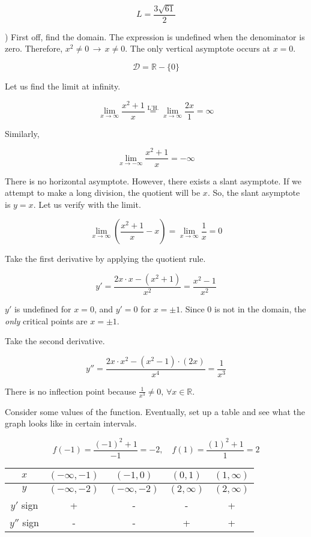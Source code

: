\documentclass{article}
\begin{document}
\[\boxed{L=\frac{3\sqrt{61}}{2}}\]

\hfill

) First off, find the domain. The expression is undefined when the denominator is zero. Therefore, $x^2 \neq 0 \,\rightarrow\, x\neq0$. The only vertical asymptote occurs at $x = 0$.

\[\mathcal{D} = \mathbb{R} - \{0\} \]

\noindent Let us find the limit at infinity.

\[\lim_{x\to \infty} \frac{x^2+1}{x} \overset{\text{L'H.}}{=} \lim_{x\to \infty} \frac{2x}{1} = \infty\]

\noindent Similarly,

\[\lim_{x\to -\infty} \frac{x^2+ 1}{x} = -\infty\]

\hfill

\noindent There is no horizontal asymptote. However, there exists a slant asymptote. If we attempt to make a long division, the quotient will be $x$. So, the slant asymptote is $y=x$. Let us verify with the limit.

\[\lim_{x\to\infty} \left(\frac{x^2+1}{x} - x\right) = \lim_{x\to\infty} \frac{1}{x} = 0\]

\hfill

\noindent Take the first derivative by applying the quotient rule.

\[y' = \frac{2x\cdot x - (x^2+1)}{x^2}=\frac{x^2-1}{x^2}\]

\hfill

\noindent $y'$ is undefined for $x=0$, and $y'=0$ for $x=\pm1$. Since 0 is not in the domain, the \textit{only} critical points are $x=\pm 1$.

\hfill

\noindent Take the second derivative.

\[y'' = \frac{2x\cdot x^2 - (x^2-1)\cdot(2x)}{x^4}=\frac{1}{x^3}\]

\hfill

\noindent There is no inflection point because $\displaystyle \frac{1}{x^3} \neq 0, \, \forall x \in \mathbb{R}$.

\hfill

\noindent Consider some values of the function. Eventually, set up a table and see what the graph looks like in certain intervals.

\[f(-1) = \frac{(-1)^2 + 1}{-1} = -2,\quad f(1) = \frac{(1)^2 + 1}{1} = 2\]

\begin{center}
    \large
    \begin{tabular}{ |c| c c c c| } 
    \hline
        $x$ & $(-\infty, -1)$ & $(-1, 0)$ & $(0, 1)$ &  $(1, \infty)$ \\
        \hline
        $y$ & $(-\infty, -2)$ & $(-\infty, -2)$ & $(2, \infty)$ & $(2, \infty)$\\
        \hline
        $y'$ sign & + & - & - & + \\
        \hline
        $y''$ sign & - & - & + & + \\
        \hline
    \end{tabular}
\end{center}
\end{document}
